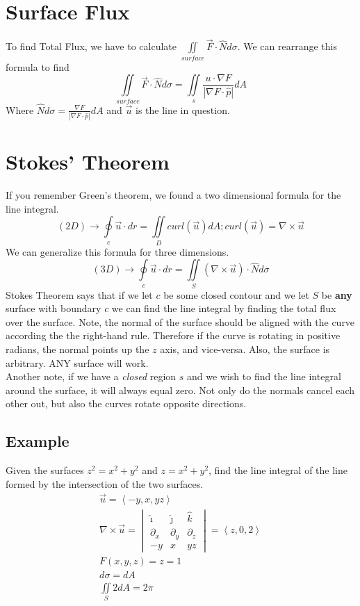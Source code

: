 \documentclass{article}
\newcommand{\nvec}[1]{\left\langle #1 \right\rangle}
\newcommand{\abs}[1]{\left\lvert #1 \right\rvert}
\begin{document}
\section{Surface Flux}
To find Total Flux, we have to calculate $\iint\limits_{surface} \vec{F} \cdot \hat{N} d \sigma$. We can rearrange this formula to find
\[
\iint\limits_{surface} \vec{F} \cdot \hat{N} d \sigma = \iint\limits_s \frac{u \cdot \nabla F}{\abs{\nabla F \cdot \hat{p} } } dA
\]
Where $\hat{N} d \sigma = \frac{\nabla F}{\abs{\nabla F \cdot \hat{p} } } dA$ and $\vec{u}$ is the line in question.

\section{Stokes' Theorem}
If you remember Green's theorem, we found a two dimensional formula for the line integral.
\[
(2D)\to \oint\limits_c \vec{u} \cdot dr = \iint\limits_D curl(\vec{u}) dA; curl(\vec{u})=\nabla \times \vec{u}
\]
We can generalize this formula for three dimensions.
\[
(3D)\to \oint\limits_c \vec{u} \cdot dr = \iint\limits_S (\nabla \times \vec{u}) \cdot \hat{N} d \sigma
\]
Stokes Theorem says that if we let $c$ be some closed contour and we let $S$ be \textbf{any} surface with boundary $c$ we can find the line integral by finding the total flux over the surface. Note, the normal of the surface should be aligned with the curve according the the right-hand rule. Therefore if the curve is rotating in positive radians, the normal points up the $z$ axis, and vice-versa. Also, the surface is arbitrary. ANY surface will work.\\

Another note, if we have a \textit{closed} region $s$ and we wish to find the line integral around the surface, it will always equal zero. Not only do the normals cancel each other out, but also the curves rotate opposite directions.\\

\subsection{Example}
Given the surfaces $z^2 = x^2 + y^2$ and $z=x^2 + y^2$, find the line integral of the line formed by the intersection of the two surfaces.
\[
\begin{aligned}
\vec{u} = \nvec{-y, x, yz}\\
\nabla \times \vec{u} = 
\begin{vmatrix}
\hat{\imath} & \hat{\jmath} & \hat{k}\\
\partial_x & \partial_y & \partial_z\\
-y & x & yz
\end{vmatrix} = \nvec{z, 0, 2}\\
F(x,y,z) = z = 1\\
d \sigma = dA\\
\iint\limits_S 2 dA = 2 \pi
\end{aligned}
\]
\end{document}

